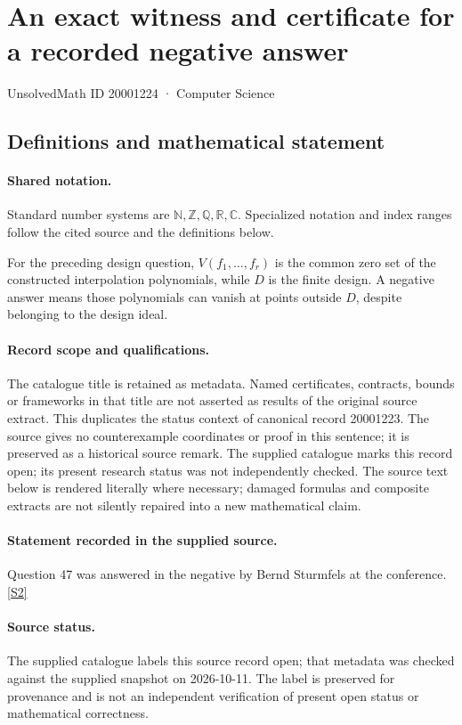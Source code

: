 \documentclass[11pt]{article}
\newcommand{\sref}[2]{\hyperlink{source:#1:#2}{[S#2]}}
\begin{document}
\setcounter{section}{20001223}
\section{An exact witness and certificate for a recorded negative answer}\label{20001224}
{\small\sffamily UnsolvedMath ID 20001224 · Computer Science}
\subsection{Definitions and mathematical statement}

\paragraph{Shared notation.}Standard number systems are $\mathbb N,\mathbb Z,\mathbb Q,\mathbb R,\mathbb C$. Specialized notation and index ranges follow the cited source and the definitions below.


For the preceding design question, $V(f_1,\ldots,f_r)$ is the common zero set of the constructed interpolation polynomials, while $D$ is the finite design. A negative answer means those polynomials can vanish at points outside $D$, despite belonging to the design ideal.
\paragraph{Record scope and qualifications.}
The catalogue title is retained as metadata. Named certificates, contracts, bounds or frameworks in that title are not asserted as results of the original source extract.
This duplicates the status context of canonical record 20001223. The source gives no counterexample coordinates or proof in this sentence; it is preserved as a historical source remark. The supplied catalogue marks this record open; its present research status was not independently checked.
The source text below is rendered literally where necessary; damaged formulas and composite extracts are not silently repaired into a new mathematical claim.
\paragraph{Statement recorded in the supplied source.}
Question 47 was answered in the negative by Bernd Sturmfels at the conference. \sref{20001224}{2}
\paragraph{Source status.}
The supplied catalogue labels this source record open; that metadata was checked against the supplied snapshot on 2026-10-11. The label is preserved for provenance and is not an independent verification of present open status or mathematical correctness.
\end{document}
